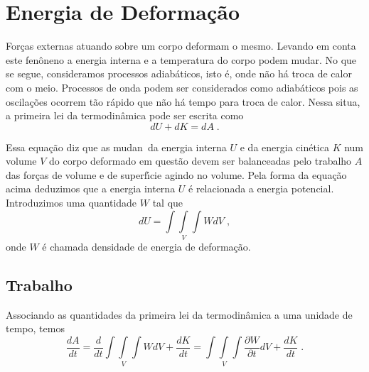 \section{Energia de Deforma\c{c}\~ao}


For\c{c}as externas atuando sobre um corpo deformam o mesmo.
Levando em conta este fen\^oneno a energia interna
e a temperatura do corpo podem mudar. No que se segue,
consideramos processos adiab\'aticos, isto \'e, onde n\~ao h\'a troca
de calor com o meio. Processos de onda podem ser considerados
como adiab\'aticos pois as oscila\c{c}\~oes
ocorrem t\~ao r\'apido que n\~ao h\'a tempo para troca de calor.
Nessa situa\cao, a primeira lei da termodin\^amica pode ser escrita como
\begin{equation}
dU+dK=dA \;.
\end{equation}

Essa equa\c{c}\~ao diz que as mudan\cas\ da energia interna $U$ e da energia cin\'etica $K$ 
num volume $V$ do corpo deformado em quest\~ao
devem ser balanceadas pelo trabalho $A$ das for\c{c}as de volume e de superf\'\i cie
agindo no volume. Pela forma da equa\c{c}\~ao acima
deduzimos que a energia interna $U$ \'e
relacionada a energia potencial. Introduzimos uma quantidade $W$ tal que
\begin{equation}
dU=\int \! \!\int\limits_{V} \! \!\int W dV \;,
\end{equation}
onde $W$ \'e chamada densidade de energia de deforma\c{c}\~ao.


\subsection{Trabalho}

Associando as quantidades da primeira lei da termodin\^amica a uma unidade de tempo, temos
\begin{equation}
\frac{dA}{dt}=\frac{d}{dt}\int \! \!\int\limits_{V} \! \!\int W dV+\frac{dK}{dt}=
\int \! \!\int\limits_{V} \! \!\int \frac{\partial W}{\partial t} dV+\frac{dK}{dt} \;.
\end{equation}


